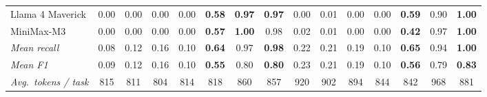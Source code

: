 \begin{table}[t]
\begin{adjustbox}{max width=\textwidth}
\begin{tabular}{l ccccc cc ccccc cc}
Llama 4 Maverick & 0.00 & 0.00 & 0.00 & 0.00 & \textbf{0.58} & \textbf{0.97} & \textbf{0.97} & 0.00 & 0.01 & 0.00 & 0.00 & \textbf{0.59} & 0.90 & \textbf{1.00} \\
MiniMax-M3 & 0.00 & 0.00 & 0.00 & 0.00 & \textbf{0.57} & \textbf{1.00} & 0.98 & 0.02 & 0.01 & 0.00 & 0.00 & \textbf{0.42} & 0.97 & \textbf{1.00} \\
\midrule
\textit{Mean recall} & 0.08 & 0.12 & 0.16 & 0.10 & \textbf{0.64} & 0.97 & \textbf{0.98} & 0.22 & 0.21 & 0.19 & 0.10 & \textbf{0.65} & 0.94 & \textbf{1.00} \\
\textit{Mean F1} & 0.09 & 0.12 & 0.16 & 0.10 & \textbf{0.55} & 0.80 & \textbf{0.80} & 0.23 & 0.21 & 0.19 & 0.10 & \textbf{0.56} & 0.79 & \textbf{0.83} \\
\textit{Avg.\ tokens / task} & 815 & 811 & 804 & 814 & 818 & 860 & 857 & 920 & 902 & 894 & 844 & 842 & 968 & 881 \\
\bottomrule
\end{tabular}
\end{adjustbox}
\end{table}

